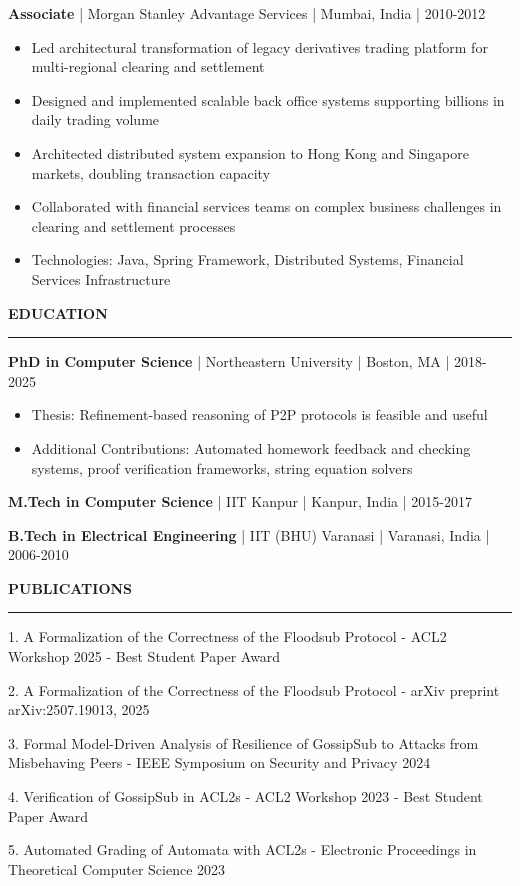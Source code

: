\documentclass[11pt,letterpaper]{article}
\newcommand{\cvsection}[1]{
    \vspace{0.5em}
    \textbf{\large #1}
    \vspace{0.2em}
    \hrule
    \vspace{0.3em}
}
\newcommand{\cventry}[6]{
    \textbf{#1} | #2 | #3 | #4
    \vspace{0.1em}
    #6
    \vspace{0.3em}
}
\begin{document}
\cventry{Associate}{Morgan Stanley Advantage Services}{Mumbai, India}{2010-2012}{}{
\begin{itemize}
    \item Led architectural transformation of legacy derivatives trading platform for multi-regional clearing and settlement
    \item Designed and implemented scalable back office systems supporting billions in daily trading volume
    \item Architected distributed system expansion to Hong Kong and Singapore markets, doubling transaction capacity
    \item Collaborated with financial services teams on complex business challenges in clearing and settlement processes
    \item Technologies: Java, Spring Framework, Distributed Systems, Financial Services Infrastructure
\end{itemize}
}

\cvsection{EDUCATION}

\textbf{PhD in Computer Science} | Northeastern University | Boston, MA | 2018-2025
\begin{itemize}
    \item Thesis: Refinement-based reasoning of P2P protocols is feasible and useful
    \item Additional Contributions: Automated homework feedback and checking systems, proof verification frameworks, string equation solvers
\end{itemize}

\textbf{M.Tech in Computer Science} | IIT Kanpur | Kanpur, India | 2015-2017

\textbf{B.Tech in Electrical Engineering} | IIT (BHU) Varanasi | Varanasi, India | 2006-2010

\cvsection{PUBLICATIONS}

1. A Formalization of the Correctness of the Floodsub Protocol - ACL2 Workshop 2025 - Best Student Paper Award

2. A Formalization of the Correctness of the Floodsub Protocol - arXiv preprint arXiv:2507.19013, 2025

3. Formal Model-Driven Analysis of Resilience of GossipSub to Attacks from Misbehaving Peers - IEEE Symposium on Security and Privacy 2024

4. Verification of GossipSub in ACL2s - ACL2 Workshop 2023 - Best Student Paper Award

5. Automated Grading of Automata with ACL2s - Electronic Proceedings in Theoretical Computer Science 2023
\end{document}
